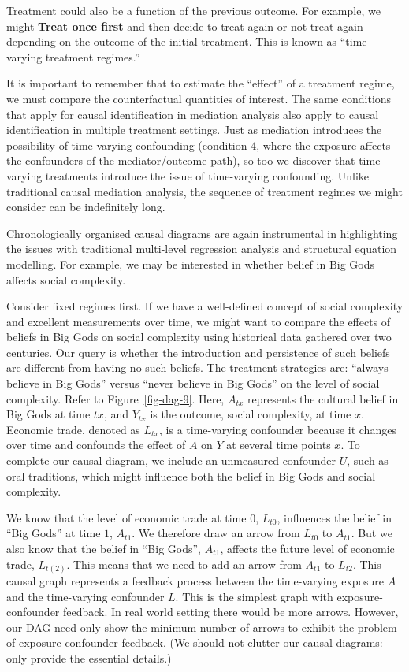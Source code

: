 \documentclass[
  singlecolumn]{report}
\begin{document}
Treatment could also be a function of the previous outcome. For example,
we might \textbf{Treat once first} and then decide to treat again or not
treat again depending on the outcome of the initial treatment. This is
known as ``time-varying treatment regimes.''

It is important to remember that to estimate the ``effect'' of a
treatment regime, we must compare the counterfactual quantities of
interest. The same conditions that apply for causal identification in
mediation analysis also apply to causal identification in multiple
treatment settings. Just as mediation introduces the possibility of
time-varying confounding (condition 4, where the exposure affects the
confounders of the mediator/outcome path), so too we discover that
time-varying treatments introduce the issue of time-varying confounding.
Unlike traditional causal mediation analysis, the sequence of treatment
regimes we might consider can be indefinitely long.

Chronologically organised causal diagrams are again instrumental in
highlighting the issues with traditional multi-level regression analysis
and structural equation modelling. For example, we may be interested in
whether belief in Big Gods affects social complexity.

Consider fixed regimes first. If we have a well-defined concept of
social complexity and excellent measurements over time, we might want to
compare the effects of beliefs in Big Gods on social complexity using
historical data gathered over two centuries. Our query is whether the
introduction and persistence of such beliefs are different from having
no such beliefs. The treatment strategies are: ``always believe in Big
Gods'' versus ``never believe in Big Gods'' on the level of social
complexity. Refer to Figure~\ref{fig-dag-9}. Here, \(A_{tx}\) represents
the cultural belief in Big Gods at time \(tx\), and \(Y_{tx}\) is the
outcome, social complexity, at time \(x\). Economic trade, denoted as
\(L_{tx}\), is a time-varying confounder because it changes over time
and confounds the effect of \(A\) on \(Y\) at several time points \(x\).
To complete our causal diagram, we include an unmeasured confounder
\(U\), such as oral traditions, which might influence both the belief in
Big Gods and social complexity.

We know that the level of economic trade at time \(0\), \(L_{t0}\),
influences the belief in ``Big Gods'' at time \(1\), \(A_{t1}\). We
therefore draw an arrow from \(L_{t0}\) to \(A_{t1}\). But we also know
that the belief in ``Big Gods'', \(A_{t1}\), affects the future level of
economic trade, \(L_{t(2)}\). This means that we need to add an arrow
from \(A_{t1}\) to \(L_{t2}\). This causal graph represents a feedback
process between the time-varying exposure \(A\) and the time-varying
confounder \(L\). This is the simplest graph with exposure-confounder
feedback. In real world setting there would be more arrows. However, our
DAG need only show the minimum number of arrows to exhibit the problem
of exposure-confounder feedback. (We should not clutter our causal
diagrams: only provide the essential details.)
\end{document}
